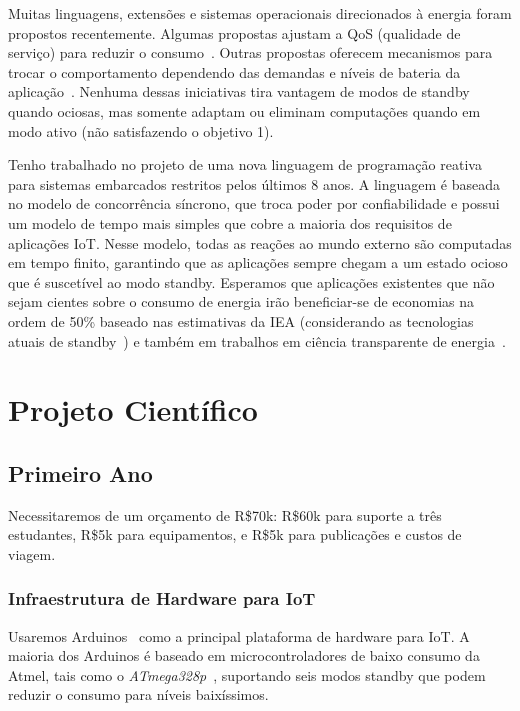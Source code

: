 \documentclass[12pt,english]{amsart}
\begin{document}
Muitas linguagens, extensões e sistemas operacionais direcionados à energia
foram propostos recentemente.
%
Algumas propostas ajustam a QoS (qualidade de serviço) para reduzir o consumo~\cite{os.ecosystem,lang.green,lang.enerj,lang.greenweb}.
%
Outras propostas oferecem mecanismos para trocar o comportamento dependendo das
demandas e níveis de bateria da aplicação~\cite{lang.eon,lang.energytypes,lang.gradual,lang.ent}.
%
Nenhuma dessas iniciativas tira vantagem de modos de standby quando ociosas,
mas somente adaptam ou eliminam computações quando em modo ativo (não
satisfazendo o objetivo 1).

Tenho trabalhado no projeto de uma nova linguagem de programação reativa para
sistemas embarcados restritos pelos últimos 8 anos.
%
A linguagem é baseada no modelo de concorrência síncrono, que troca poder por
confiabilidade e possui um modelo de tempo mais simples que cobre a maioria dos
requisitos de aplicações IoT.
%
Nesse modelo, todas as reações ao mundo externo são computadas em tempo finito,
garantindo que as aplicações sempre chegam a um estado ocioso que é suscetível
ao modo standby.
%
Esperamos que aplicações existentes que não sejam cientes sobre o consumo de
energia irão beneficiar-se de economias na ordem de 50\% baseado nas
estimativas da IEA (considerando as tecnologias atuais de
standby~\cite{iea.data}) e também em trabalhos em ciência transparente de
energia~\cite{wsn.tos.2}.

\section{Projeto Científico}

\subsection{Primeiro Ano}
\label{sec.first}

Necessitaremos de um orçamento de R\$70k:
R\$60k para suporte a três estudantes, R\$5k para equipamentos, e
R\$5k para publicações e custos de viagem.

\subsubsection{Infraestrutura de Hardware para IoT}

Usaremos Arduinos~\cite{arduino} como a principal plataforma de hardware para
IoT.
A maioria dos Arduinos é baseado em microcontroladores de baixo consumo da
Atmel, tais como o \emph{ATmega328p}~\cite{arduino.atmega328p}, suportando
seis modos standby que podem reduzir o consumo para níveis baixíssimos.
\end{document}
